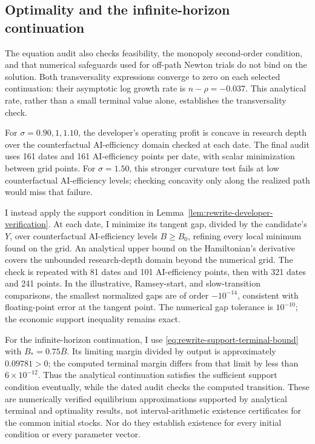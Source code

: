 \subsection{Optimality and the infinite-horizon continuation}

The equation audit also checks feasibility, the monopoly second-order
condition, and that numerical safeguards used for off-path Newton trials do
not bind on the solution. Both transversality expressions converge to zero
on each selected continuation: their asymptotic log growth rate is
$n-\rho=-0.037$. This analytical rate, rather than a small terminal value
alone, establishes the transversality check.

For $\sigma=0.90,1,1.10$, the developer's operating profit is concave in
research depth over the counterfactual AI-efficiency domain checked at each
date. The final audit uses 161 dates and 161 AI-efficiency points per date,
with scalar minimization between grid points. For $\sigma=1.50$, this
stronger curvature test fails at low counterfactual AI-efficiency levels; checking
concavity only along the realized path would miss that failure.

I instead apply the support condition in
Lemma~\ref{lem:rewrite-developer-verification}. At each
date, I minimize its tangent gap, divided by the candidate's $Y$, over
counterfactual AI-efficiency levels $B\geq B_0$, refining every local minimum found
on the grid. An analytical upper bound on the Hamiltonian's derivative
covers the unbounded research-depth domain beyond the numerical grid.
The check is repeated with 81 dates and 101 AI-efficiency points, then with
321 dates and 241 points. In the illustrative, Ramsey-start, and slow-transition comparisons, the
smallest normalized gaps are of order $-10^{-14}$, consistent with
floating-point error at the tangent point. The numerical gap tolerance is
$10^{-10}$; the economic support
inequality remains exact.

For the infinite-horizon continuation, I use
\eqref{eq:rewrite-support-terminal-bound} with $B_*=0.75\overline B$.
Its limiting margin divided by output is approximately $0.09781>0$;
the computed terminal margin differs from that limit by less than
$6\times10^{-12}$. Thus the analytical continuation satisfies the
sufficient support condition eventually, while the dated audit checks the
computed transition. These are numerically verified equilibrium
approximations supported by analytical terminal and optimality results,
not interval-arithmetic existence certificates for the common initial
stocks. Nor do they establish existence for every initial condition or
every parameter vector.

